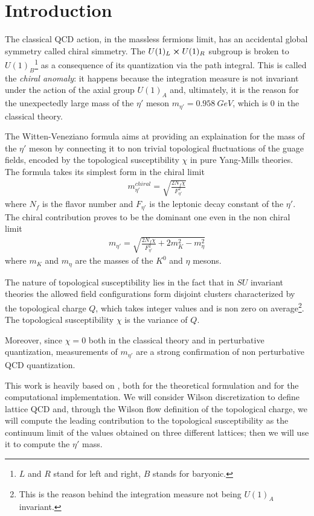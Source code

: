 \section{Introduction}%
\label{sec:intro}

The classical QCD action, in the massless fermions limit, has an accidental global symmetry
called chiral simmetry. The $U(1)_{L}\cp U(1)_{R}$ subgroup is broken to $U(1)_{B}$\footnote{$L$ and $R$ stand for left and right, $B$ stands for baryonic.} as a consequence of its quantization via the path integral.
This is called the \textit{chiral anomaly}: it happens because the integration measure is not invariant
under the action of the axial group $U(1)_{A}$ and, ultimately, it is the reason for the unexpectedly large mass of the
$\eta'$ meson $m_{\eta'}=\SI{0.958}{GeV}$, which is $0$ in the classical theory.

The Witten-Veneziano formula aims at providing an explaination for the mass of the
$\eta' $ meson by connecting it to non trivial topological fluctuations of the guage fields, encoded by the topological susceptibility $\chi$ in pure Yang-Mills theories. The formula takes its simplest
form in the chiral limit
\begin{align}
  \label{eqn:chiralm}m_{\eta' }^{chiral} = \sqrt{\frac{2N_{f}\chi}{F_{\eta'}^2}}
\end{align}
where $N_{f}$ is the flavor number and $F_{\eta'}$ is the leptonic decay constant of the $\eta'$.
The chiral contribution proves to be the dominant one even in the non chiral limit
\begin{align}
  \label{eqn:nonchiralmass}m_{\eta'}= \sqrt{\frac{2N_{f}\chi}{F_{\eta'}^2} +2m_{K}^2-m_{\eta}^2}
\end{align}
where $m_{K}$ and $m_{\eta}$ are the masses of the $K ^{0}$ and $\eta$ mesons.

The nature of topological susceptibility lies in the fact that in $SU$ invariant theories the allowed
field configurations form disjoint clusters characterized by the topological charge $Q$, which takes integer values and is
non zero on average\footnote{This is the reason behind the integration measure not being $U(1)_{A}$ invariant.}.
The topological susceptibility $\chi$ is the variance of $Q$.

Moreover, since $\chi = 0$ both in the classical theory and in perturbative quantization,
measurements of $m_{\eta'}$ are a strong confirmation of non perturbative QCD quantization.

This work is heavily based on \cite{Ce}, both for the theoretical formulation and for the computational implementation.
We will consider Wilson discretization to define lattice QCD and, through the Wilson flow definition of the topological charge,
we will compute the leading contribution to the topological susceptibility as the continuum limit of the values obtained
on three different lattices; then we will use it to compute the $\eta'$ mass.
